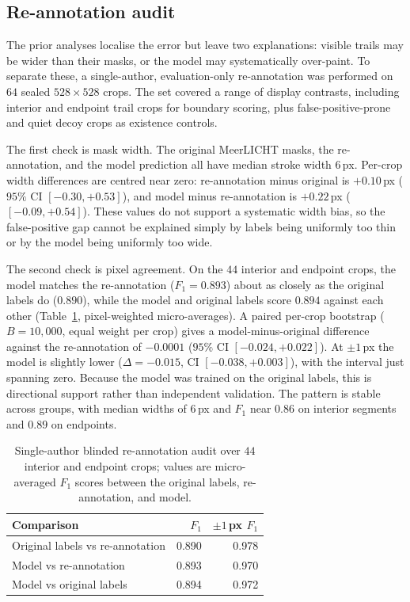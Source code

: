 \documentclass{cam-thesis}
\begin{document}
\subsection{Re-annotation audit}
\label{sec:ext_reannotation}

The prior analyses localise the error but leave two explanations:
visible trails may be wider than their masks, or the model may
systematically over-paint. To separate these, a single-author,
evaluation-only re-annotation was performed on $64$ sealed $528\times528$
crops. The set covered a range of display contrasts, including interior
and endpoint trail crops for boundary scoring, plus false-positive-prone and
quiet decoy crops as existence controls.

The first check is mask width. The original MeerLICHT masks, the re-annotation,
and the model prediction all have median stroke width $6$\,px. Per-crop width
differences are centred near zero: re-annotation minus original is $+0.10$\,px
($95\%$ CI $[-0.30,+0.53]$), and model minus re-annotation is $+0.22$\,px
($[-0.09,+0.54]$). These values do not support a systematic width bias, so the
false-positive gap cannot be explained simply by labels being uniformly too thin
or by the model being uniformly too wide.

The second check is pixel agreement. On the $44$ interior and endpoint crops,
the model matches the re-annotation ($F_1=0.893$) about as closely as the
original labels do ($0.890$), while the model and original labels score $0.894$
against each other (Table~\ref{tab:reannotation}, pixel-weighted micro-averages).
A paired per-crop bootstrap ($B=10{,}000$, equal weight per crop) gives a
model-minus-original difference against the re-annotation of $-0.0001$
($95\%$ CI $[-0.024,+0.022]$). At $\pm1$\,px the model is slightly lower
($\Delta=-0.015$, CI $[-0.038,+0.003]$), with the interval just spanning zero.
Because the model was trained on the original labels, this is directional support
rather than independent validation. The pattern is stable across groups,
with median widths of $6$\,px and $F_1$ near $0.86$ on interior segments and
$0.89$ on endpoints.

\begin{table}[htbp]
  \centering
  \caption{Single-author blinded re-annotation audit over $44$ interior and
           endpoint crops; values are micro-averaged $F_1$ scores between the
           original labels, re-annotation, and model.}
  \label{tab:reannotation}
  \begin{tabular}{lrr}
    \toprule
    Comparison & $F_1$ & $\pm1$\,px $F_1$ \\
    \midrule
    Original labels vs re-annotation & 0.890 & 0.978 \\
    Model vs re-annotation             & 0.893 & 0.970 \\
    Model vs original labels         & 0.894 & 0.972 \\
    \bottomrule
  \end{tabular}
\end{table}
\end{document}

